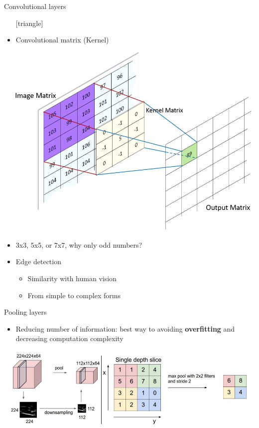 \documentclass{beamer}
\begin{document}
\begin{frame}{Convolutional layers}
	\begin{itemize}
		\setlength\itemsep{1em}
		[triangle]
		\item 
			Convolutional matrix (Kernel)
	\end{itemize}
	\begin{center}
		\includegraphics[scale=0.2]{kernel}
	\end{center}
	\begin{itemize}
		\setlength\itemsep{1em}
		[triangle]
		\item 
			3x3, 5x5, or 7x7, why only odd numbers?
		\item 
			Edge detection
			\begin{itemize}
				[circle]
				\item 
					Similarity with human vision
				\item 
					From simple to complex forms
			\end{itemize}
	\end{itemize}
\end{frame}

\begin{frame}{Pooling layers}
	\begin{itemize}
		\setlength\itemsep{1em}
		[triangle]
		\item 
			Reducing number of information: best way to avoiding \textbf{overfitting} and decreasing 							computation complexity
	\end{itemize}
	\includegraphics[scale=0.35]{pooling}
\end{frame}
\end{document}
